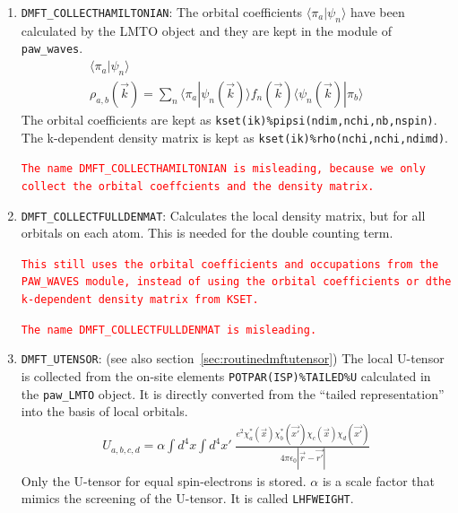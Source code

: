 \documentclass[11pt,a4paper]{report}
\newcommand{\petertt}[1]{\textcolor{red}{\texttt{#1}}}
\begin{document}
\begin{enumerate}
\item \verb|DMFT_COLLECTHAMILTONIAN|: The orbital coefficients
  $\langle\pi_a|\psi_n\rangle$ have been calculated by the LMTO object
  and they are kept in the module of \verb|paw_waves|.
\begin{eqnarray}
\langle\pi_a|\psi_n\rangle&&
\\
\rho_{a,b}(\vec{k})=\sum_n
\langle\pi_a|\psi_n(\vec{k})\rangle f_n(\vec{k})
\langle\psi_n(\vec{k})|\pi_b\rangle
\end{eqnarray}
The orbital coefficients are kept as
\verb|kset(ik)%pipsi(ndim,nchi,nb,nspin)|. The k-dependent density
matrix is kept as \verb|kset(ik)%rho(nchi,nchi,ndimd)|.

\petertt{The name DMFT\_COLLECTHAMILTONIAN is misleading,
  because we only collect the orbital coeffcients and the density
  matrix.}
%
\item \verb|DMFT_COLLECTFULLDENMAT|: Calculates the local density matrix,
  but for all orbitals on each atom. This is needed for the double
  counting term.

 \petertt{This still uses the orbital coefficients and occupations
   from the PAW\_WAVES module, instead of using the orbital
   coefficients or dthe k-dependent density matrix from KSET.}

 \petertt{The name DMFT\_COLLECTFULLDENMAT is misleading.}
%
\item \verb|DMFT_UTENSOR|: (see also
  section~\ref{sec:routinedmftutensor}) The local U-tensor is
  collected from the on-site elements \verb|POTPAR(ISP)%TAILED%U|
  calculated in the \verb|paw_LMTO| object. It is directly converted
  from the ``tailed representation'' into the basis of local orbitals.
\begin{eqnarray}
U_{a,b,c,d}=\alpha\int d^4x\int d^4x'\;
\frac{e^2\chi^*_a(\vec{x})\chi^*_b(\vec{x'})\chi_c(\vec{x})\chi_d(\vec{x'})}
{4\pi\epsilon_0|\vec{r}-\vec{r'}|}
\label{eq:defutensordmftobject}
\end{eqnarray}
Only the U-tensor for equal spin-electrons is stored. $\alpha$ is a
scale factor that mimics the screening of the U-tensor. It is called
\verb|LHFWEIGHT|.


\end{enumerate}
\end{document}

